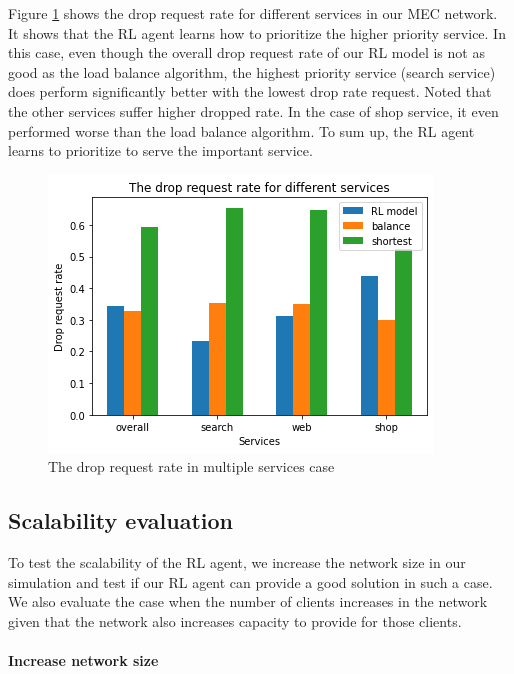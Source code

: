 \documentclass[conference]{IEEEtran}
\begin{document}
Figure \ref{fig:multiple_service_drop_request_rate_result} shows the drop request rate for different services in our MEC network. It shows that the RL agent learns how to prioritize the higher priority service. In this case, even though the overall drop request rate of our RL model is not as good as the load balance algorithm, the highest priority service (search service) does perform significantly better with the lowest drop rate request. Noted that the other services suffer higher dropped rate. In the case of shop service, it even performed worse than the load balance algorithm. To sum up, the RL agent learns to prioritize to serve the important service. 

\begin{figure}[]
    \centering
    \includegraphics[scale = 0.5]{imgs/multiple_service_drop_request_rate_result.png}
    \caption{The drop request rate in multiple services case}
    \label{fig:multiple_service_drop_request_rate_result}
\end{figure}

\subsection{Scalability evaluation}
To test the scalability of the RL agent, we increase the network size in our simulation and test if our RL agent can provide a good solution in such a case. We also evaluate the case when the number of clients increases in the network given that the network also increases capacity to provide for those clients.

\paragraph{Increase network size}
\end{document}
